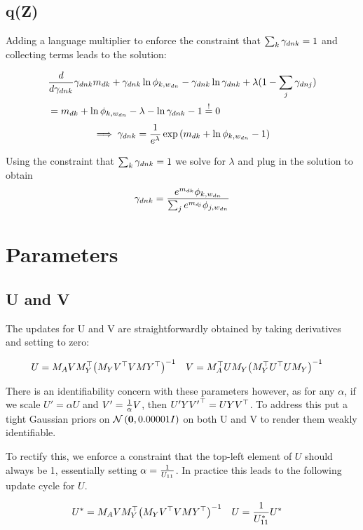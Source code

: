 \subsection{q(Z)}
Adding a language multiplier to enforce the constraint that $\sum_k { \gamma_{dnk} } = 1$ and collecting terms leads to the solution:

\begin{align}
& \frac{d}{d { \gamma_{dnk} }} { \gamma_{dnk} } m_{dk} + { \gamma_{dnk} } \ln \phi_{k,w_{dn}} - { \gamma_{dnk} } \ln { \gamma_{dnk} } + \lambda (1 - \sum_j \gamma_{dnj}) \\
& = m_{dk} + \ln \phi_{k,w_{dn}} -\lambda - \ln { \gamma_{dnk} } - 1 \overset{!}{=} 0
\end{align}
\begin{align}
\implies { \gamma_{dnk} } = \frac{1}{ {e^\lambda} } \exp\left(m_{dk} + \ln \phi_{k,{w_{dn}}} -1 \right)
\end{align}

Using the constraint that $\sum_k { \gamma_{dnk} } = 1$ we solve for $\lambda$ and plug in the solution to obtain
\begin{align}
{ \gamma_{dnk} } = \frac{e^{m_{dk}} \phi_{k,w_{dn}}}{\sum_j e^{m_{dj}} \phi_{j,w_{dn}}}
\end{align}

\section{Parameters}
\subsection{U and V}
The updates for U and V are straightforwardly obtained by taking derivatives and setting to zero:

\begin{align}
U & = M_A V M_Y^\top {\left( M_Y V ^\top V MY ^\top \right)}^{-1} &
V & = M_A^\top U M_Y {\left( M_Y^\top U^\top U M_Y \right)}^{-1} \label{eqn:app-v-update}
\end{align}

There is an identifiability concern with these parameters however, as for any $\alpha$, if we scale $U' = \alpha U$ and $V' = \frac{1}{ {\alpha} } V$, then $U'Y{V'}^\top = U Y V^\top$. To address this put a tight Gaussian priors on $\mathcal{N} \left( {\bm 0}, {0.00001 I} \right)$ on both U and V to render them weakly identifiable.

To rectify this, we enforce a constraint that the top-left element of $U$ should always be 1, essentially setting $\alpha = \frac{1}{ {U_{11}} }$. In practice this leads to the following update cycle for $U$.

\begin{align}
U^* &= M_A V M_Y^\top {\left( M_Y V ^\top V MY ^\top \right)}^{-1} &
U &= \frac{1}{U^*_{11}} U^*
\end{align}

